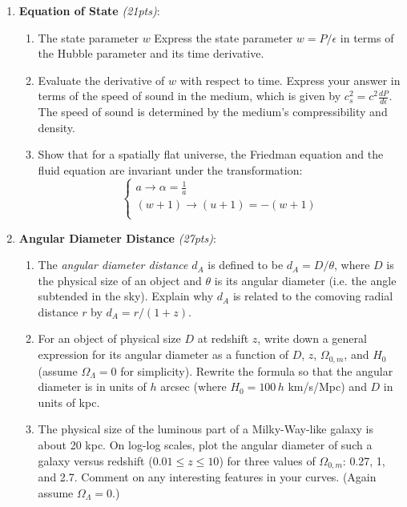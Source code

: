\documentclass[12pt,preprint]{aastex}
\begin{document}
\begin{enumerate}
\item \textbf{Equation of State} \textit{(21pts)}: 
	\begin{enumerate}
	\item The state parameter $w$ Express the state parameter $w=P/\epsilon$ in terms of the Hubble parameter and its time derivative.
	\item Evaluate the derivative of $w$ with respect to time. Express your answer in terms of the speed of sound in the medium, which is given by $c_s^2 = c^2 \frac{dP}{d\epsilon}$. The speed of sound is determined by the medium's compressibility and density. 
	\item Show that for a spatially flat universe, the Friedman equation and the fluid equation are invariant under the transformation:
	$$\begin{cases}
	a \rightarrow \alpha = \frac{1}{a} \\ 
	(w+1) \rightarrow (u + 1) = -(w+1) \\
	\end{cases}$$
	\end{enumerate}

\item \textbf{Angular Diameter Distance} \textit{(27pts)}: 
	\begin{enumerate} 
	\item The {\it angular diameter distance} $d_A$ is defined to be $d_A=D/\theta$, where $D$ is the physical size of an object and $\theta$ is its angular diameter (i.e. the angle subtended in the sky).  Explain why $d_A$ is related to the comoving radial distance $r$ by $ d_A = r/(1+z)$.
	\item For an object of physical size $D$ at redshift $z$, write down a general expression for its angular diameter as a function of $D$, $z$, $\Omega_{0,m}$, and $H_0$ (assume $\Omega_\Lambda=0$ for simplicity). Rewrite the formula so that the angular diameter is in units of $h$ arcsec (where $H_0=100\,h$ km/s/Mpc) and $D$ in units of kpc.
	\item The physical size of the luminous part of a Milky-Way-like galaxy is about 20 kpc.  On log-log scales, plot the angular diameter of such a galaxy versus redshift ($0.01 \le z \le 10$) for three values of $\Omega_{0,m}$: 0.27, 1, and 2.7.  Comment on any interesting features in your curves.  (Again assume $\Omega_\Lambda=0$.)
	\end{enumerate}



\end{enumerate}
\end{document}
